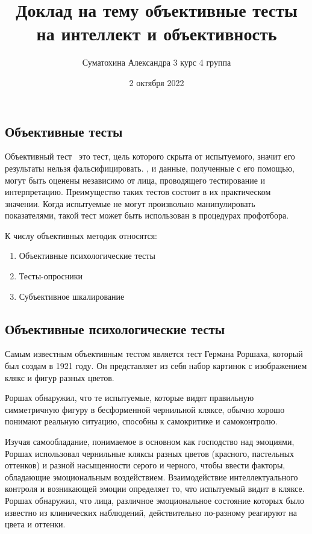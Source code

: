 
\title{Доклад на тему объективные тесты на интеллект и объективность}
\author{Суматохина Александра 3 курс 4 группа}
\date{2 октября 2022}

\maketitle
\subsection*{Объективные тесты}
Объективный тест \textendash\ это тест, цель которого скрыта от испытуемого, значит 
его результаты нельзя фальсифицировать. 
, и данные, полученные с его помощью, могут быть оценены независимо от лица, 
проводящего тестирование и интерпретацию. 
Преимущество таких тестов состоит в их практическом значении. 
Когда испытуемые не могут произвольно манипулировать показателями, 
такой тест может быть использован в процедурах профотбора.

К числу объективных методик относятся:
\begin{enumerate}
    \item Объективные психологические тесты
    \item Тесты-опросники
    \item Субъективное шкалирование
\end{enumerate} 

\subsection*{Объективные психологические тесты}
Самым известным объективным тестом является тест Германа Роршаха, 
который был создам в 1921 году. Он представляет из себя набор картинок с 
изображением клякс и фигур разных цветов. 

Роршах обнаружил, что те испытуемые, которые видят правильную 
симметричную фигуру в бесформенной чернильной кляксе, обычно 
хорошо понимают реальную ситуацию, способны к самокритике и 
самоконтролю.

Изучая самообладание, понимаемое в основном как господство над 
эмоциями, Роршах использовал чернильные кляксы разных цветов 
(красного, пастельных оттенков) и разной насыщенности серого и 
черного, чтобы ввести факторы, обладающие эмоциональным воздействием. 
Взаимодействие интеллектуального контроля и возникающей эмоции 
определяет то, что испытуемый видит в кляксе. Роршах обнаружил, 
что лица, различное эмоциональное состояние которых было известно 
из клинических наблюдений, действительно по-разному реагируют на 
цвета и оттенки.

